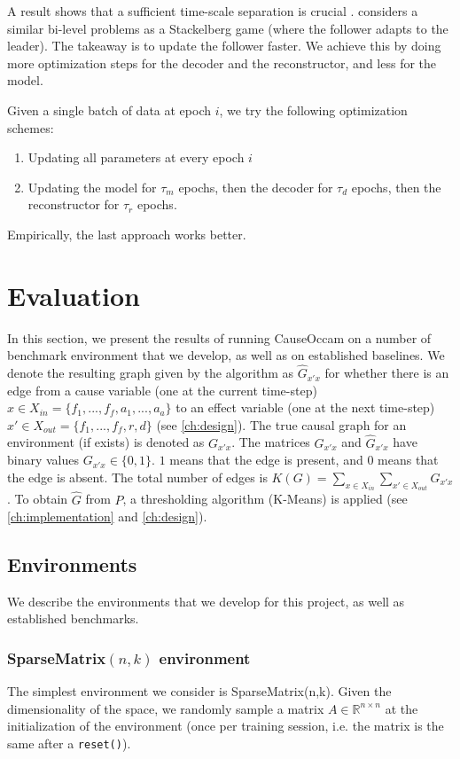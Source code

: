 \documentclass[a4paper,11pt,oneside]{report}
\newcommand{\sysname}{CauseOccam\xspace}
\begin{document}
A result shows that a sufficient time-scale separation is crucial \cite{Fiez2020}.
 \cite{Rajeswaran2020} considers a similar bi-level problems as a Stackelberg game (where the follower adapts to the leader). The takeaway is to update the follower faster. We achieve this by doing more optimization steps for the decoder and the reconstructor, and less for the model.

Given a single batch of data at epoch $i$, we try the following optimization schemes:
\begin{enumerate}
    \item Updating all parameters at every epoch $i$
    \item Updating the model for $\tau_m$ epochs, then the decoder for $\tau_d$ epochs, then the reconstructor for $\tau_r$ epochs.
\end{enumerate}

Empirically, the last approach works better.


\chapter{Evaluation}
\label{ch:evaluation}
In this section, we present the results of running \sysname on a number of benchmark environment that we develop, as well as on established baselines.
We denote the resulting graph given by the algorithm as $\hat{G}_{x'x}$ for whether there is an edge from a cause variable (one at the current time-step) $x\in X_{in}=\{f_1,...,f_f,a_1,...,a_a\}$ to an effect variable (one at the next time-step) $x'\in X_{out}=\{f_1,...,f_f,r,d\}$ (see \autoref{ch:design}). The true causal graph for an environment (if exists) is denoted as $G_{x'x}$. The matrices $G_{x'x}$ and $\hat{G}_{x'x}$ have binary values $G_{x'x}\in\{0,1\}$. $1$ means that the edge is present, and $0$ means that the edge is absent. The total number of edges is $K(G)=\sum\limits_{x\in X_{in}}\sum\limits_{x'\in X_{out}}G_{x'x}$. To obtain $\hat{G}$ from $P$, a thresholding algorithm (K-Means) is applied (see \autoref{ch:implementation} and \autoref{ch:design}).

\section{Environments}
We describe the environments that we develop for this project, as well as established benchmarks.

\subsection{SparseMatrix$(n,k)$ environment}
The simplest environment we consider is SparseMatrix(n,k). Given the dimensionality of the space, we randomly sample a matrix $A\in \mathbb R^{n\times n}$ at the initialization of the environment (once per training session, i.e. the matrix is the same after a {\tt reset()}).
\end{document}
